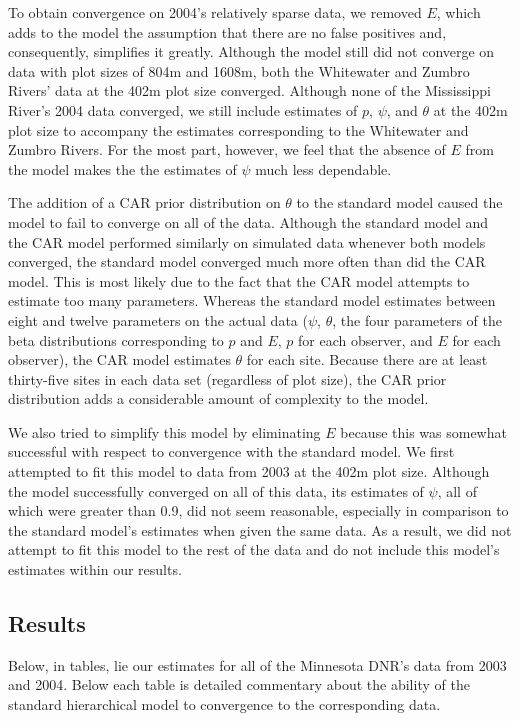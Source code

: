 \documentclass{article}
\begin{document}
    To obtain convergence on 2004's relatively sparse data, we removed \(E\),
    which adds to the model the assumption that there are no false positives
    and, consequently, simplifies it greatly.  Although the model still did not
    converge on data with plot sizes of 804m and 1608m, both the Whitewater and
    Zumbro Rivers' data at the 402m plot size converged.  Although none of the
    Mississippi River's 2004 data converged, we still include estimates of
    \(p\), \(\psi\), and \(\theta\) at the 402m plot size to accompany the
    estimates corresponding to the Whitewater and Zumbro Rivers.  For the most
    part, however, we feel that the absence of \(E\) from the model makes the
    the estimates of \(\psi\) much less dependable.

    The addition of a CAR prior distribution on \(\theta\) to the standard model
    caused the model to fail to converge on all of the data.  Although the
    standard model and the CAR model performed similarly on simulated data
    whenever both models converged, the standard model converged much more often
    than did the CAR model.  This is most likely due to the fact that the CAR
    model attempts to estimate too many parameters.  Whereas the standard model
    estimates between eight and twelve parameters on the actual data (\(\psi\),
    \(\theta\), the four parameters of the beta distributions corresponding to
    \(p\) and \(E\), \(p\) for each observer, and \(E\) for each observer), the
    CAR model estimates \(\theta\) for each site.  Because there are at least
    thirty-five sites in each data set (regardless of plot size), the CAR prior
    distribution adds a considerable amount of complexity to the model.

    We also tried to simplify this model by eliminating \(E\) because this was
    somewhat successful with respect to convergence with the standard model.  We
    first attempted to fit this model to data from 2003 at the 402m plot size.
    Although the model successfully converged on all of this data, its estimates
    of \(\psi\), all of which were greater than 0.9, did not seem reasonable,
    especially in comparison to the standard model's estimates when given the
    same data.  As a result, we did not attempt to fit this model to the rest of
    the data and do not include this model's estimates within our results.

    \subsection{Results}
    Below, in tables, lie our estimates for all of the Minnesota DNR's data from
    2003 and 2004.  Below each table is detailed commentary about the ability of
    the standard hierarchical model to convergence to the corresponding data.
\end{document}
